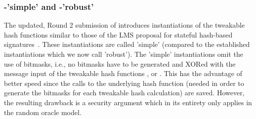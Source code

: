 
\subsubsection{\spx-'simple' and \spx-'robust'}

The updated, Round 2 submission of \spx introduces instantiations of the tweakable hash functions similar to those of the LMS proposal for stateful hash-based signatures~\cite{LMSdraft}. These instantiations are called 'simple' (compared to the established instantiations which we now call 'robust'). The 'simple' instantiations omit the use of bitmasks, i.e., no bitmasks have to be generated and XORed with the message input
of the tweakable hash functions \sphincsF, \sphincsH or \sphincsT.
This has the advantage of better speed since the calls to
the underlying hash function (needed in order to generate the bitmasks for each tweakable hash calculation) are saved. However, the resulting drawback is a security argument which in its entirety only applies in the random oracle model.

